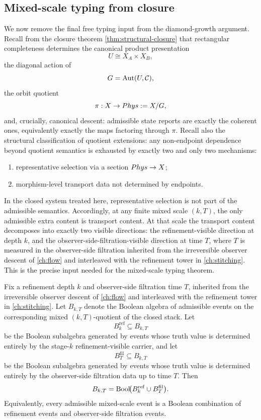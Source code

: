 \subsection{Mixed-scale typing from closure}
\label{subsec:mixed-typing}
We now remove the final free typing input from the diamond-growth
argument.
Recall from the closure theorem
\cref{thm:structural-closure} that
rectangular completeness determines the canonical product presentation
\[
	U \cong X_A\times X_B,
\]
the diagonal action of
\[
	G=\operatorname{Aut}(U,\mathcal C),
\]
the orbit quotient
\[
	\pi:X\to Phys:=X/G,
\]
and, crucially, canonical descent: admissible state reports are exactly the
coherent ones, equivalently exactly the maps factoring through \(\pi\).
Recall also the structural classification of quotient extensions: any
non-endpoint dependence beyond quotient semantics is exhausted by
exactly two and only two mechanisms:
\begin{enumerate}[label=\textup{(\arabic*)}]
	\item representative selection via a section \(Phys\to X\);
	\item morphism-level transport data not determined by endpoints.
\end{enumerate}
In the closed system treated here, representative selection is not part
of the admissible semantics.  Accordingly, at any finite mixed scale
\((k,T)\), the only admissible extra content is transport content.  At
that scale the transport content decomposes into exactly two visible
directions: the refinement-visible direction at depth \(k\), and the
observer-side-filtration-visible direction at time \(T\), where \(T\)
is measured in the observer-side filtration inherited from the
irreversible observer descent of \cref{ch:flow} and interleaved with
the refinement tower in \cref{ch:stitching}.  This is the precise
input needed for the mixed-scale typing theorem.
\begin{theorem}
	\label{thm:mixed-typing}
	Fix a refinement depth \(k\) and observer-side filtration time \(T\),
	inherited from the irreversible observer descent of
	\cref{ch:flow} and interleaved with the refinement tower in
	\cref{ch:stitching}.  Let \(B_{k,T}\) denote the Boolean algebra of
	admissible events on the corresponding mixed \((k,T)\)-quotient of
	the closed stack.
	Let
	\[
		B_k^{\mathrm{ref}}\subseteq B_{k,T}
	\]
	be the Boolean subalgebra generated by events whose truth value is
	determined entirely by the stage-\(k\) refinement-visible carrier, and
	let
	\[
		B_T^{\mathrm{fil}}\subseteq B_{k,T}
	\]
	be the Boolean subalgebra generated by events whose truth value is
	determined entirely by the observer-side filtration data up to time
	\(T\).
	Then
	\[
		B_{k,T}=\operatorname{Bool}\!\bigl(B_k^{\mathrm{ref}}\cup B_T^{\mathrm{fil}}\bigr).
	\]
	Equivalently, every admissible mixed-scale event is a Boolean
	combination of refinement events and observer-side filtration
	events.
\end{theorem}
